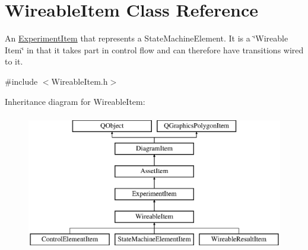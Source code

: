\hypertarget{class_wireable_item}{\section{Wireable\-Item Class Reference}
\label{class_wireable_item}
}


An \hyperlink{class_experiment_item}{Experiment\-Item} that represents a State\-Machine\-Element. It is a \char`\"{}\-Wireable Item\char`\"{} in that it takes part in control flow and can therefore have transitions wired to it.  




{\ttfamily \#include $<$Wireable\-Item.\-h$>$}

Inheritance diagram for Wireable\-Item\-:\begin{figure}[H]
\begin{center}
\leavevmode
\includegraphics[height=6.000000cm]{class_wireable_item}
\end{center}
\end{figure}
